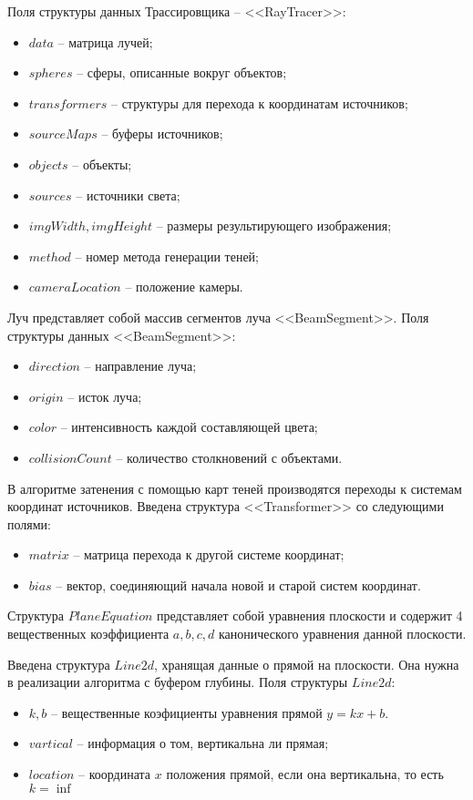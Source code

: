 {        Поля структуры данных Трассировщика -- <<RayTracer>>:
     \begin{itemize}
        \item $data$ -- матрица лучей;
        \item $spheres$ -- сферы, описанные вокруг объектов;
        \item $transformers$ -- структуры для перехода к координатам источников;
        \item $sourceMaps$ -- буферы источников;
        \item $objects$ -- объекты;
        \item $sources$ -- источники света;
        \item $imgWidth, imgHeight$ -- размеры результирующего изображения;
        \item $method$ -- номер метода генерации теней;
        \item $cameraLocation$ -- положение камеры.
     \end{itemize}
    
    Луч представляет собой массив сегментов луча <<BeamSegment>>.
    Поля структуры данных <<BeamSegment>>:
    \begin{itemize}
        \item $direction$ -- направление луча;
         \item $origin$ -- исток луча;
        \item $color$ -- интенсивность каждой составляющей цвета;
        \item $collisionCount$ -- количество столкновений с объектами.
    \end{itemize}
    
    В алгоритме затенения с помощью карт теней производятся переходы
    к системам координат источников.
    Введена структура <<Transformer>> со следующими полями:
    \begin{itemize}
        \item $matrix$ -- матрица перехода к другой системе координат;
        \item $bias$ -- вектор, соединяющий начала новой и старой систем координат.
    \end{itemize}

    Структура $PlaneEquation$ представляет собой уравнения плоскости и содержит
    4 вещественных коэффициента $a, b, c, d$
    канонического уравнения данной плоскости.

    Введена структура $Line2d$, хранящая данные о прямой на плоскости.
    Она нужна в реализации алгоритма с буфером глубины.
    Поля структуры $Line2d$:
    \begin{itemize}
        \item $k, b$ -- вещественные коэфициенты уравнения прямой $y = kx + b$.
        \item $vartical$ -- информация о том, вертикальна ли прямая;
        \item $location$ -- координата $x$ положения прямой,
        если она вертикальна, то есть $k = \inf$
    \end{itemize}
}